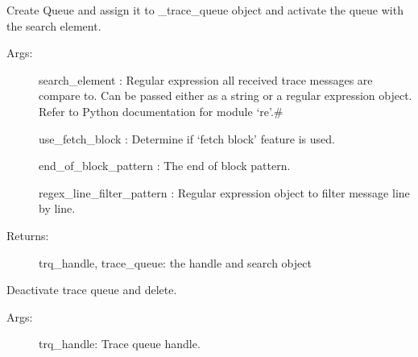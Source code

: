 \documentclass[letterpaper,10pt,english]{sphinxmanual}
\begin{document}
\begin{fulllineitems}
\begin{fulllineitems}
\label{\detokenize{QConnectionLibrary:QConnectionLibrary.connection_base.ConnectionBase.create_and_activate_trace_queue}}
\sphinxAtStartPar
Create Queue and assign it to \_trace\_queue object and activate the queue with the search element.
\begin{description}
\item[{Args:}] \leavevmode
\sphinxAtStartPar
search\_element :  Regular expression all received trace messages are compare to.                Can be passed either as a string or a regular expression object. Refer to Python documentation for module ‘re’.\#

\sphinxAtStartPar
use\_fetch\_block : Determine if ‘fetch block’ feature is used.

\sphinxAtStartPar
end\_of\_block\_pattern : The end of block pattern.

\sphinxAtStartPar
regex\_line\_filter\_pattern : Regular expression object to filter message line by line.

\item[{Returns:}] \leavevmode
\sphinxAtStartPar
trq\_handle, trace\_queue: the handle and search object

\end{description}

\end{fulllineitems}


\begin{fulllineitems}
\label{\detokenize{QConnectionLibrary:QConnectionLibrary.connection_base.ConnectionBase.deactivate_and_delete_trace_queue}}
\sphinxAtStartPar
Deactivate trace queue and delete.
\begin{description}
\item[{Args:}] \leavevmode
\sphinxAtStartPar
trq\_handle: Trace queue handle.


\end{description}
\end{fulllineitems}
\end{fulllineitems}
\end{document}
